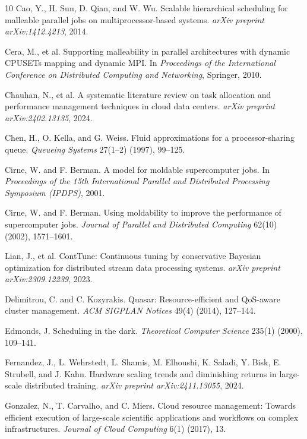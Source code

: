 \documentclass[11pt]{article}
\theoremstyle{remark}
\theoremstyle{definition}
\numberwithin{equation}{section}
\begin{document}
{\begin{thebibliography}{10}
Cao, Y., H. Sun, D. Qian, and W. Wu.
Scalable hierarchical scheduling for malleable parallel jobs on multiprocessor-based systems.
\textit{arXiv preprint arXiv:1412.4213}, 2014.

Cera, M., et al.
Supporting malleability in parallel architectures with dynamic CPUSETs mapping and dynamic MPI.
In \textit{Proceedings of the International Conference on Distributed Computing and Networking}, Springer, 2010.

Chauhan, N., et al.
A systematic literature review on task allocation and performance management techniques in cloud data centers.
\textit{arXiv preprint arXiv:2402.13135}, 2024.

Chen, H., O. Kella, and G. Weiss.
Fluid approximations for a processor-sharing queue.
\textit{Queueing Systems} 27(1--2) (1997), 99--125.

 Cirne, W. and F. Berman.
 A model for moldable supercomputer jobs.
 In \textit{Proceedings of the 15th International Parallel and Distributed Processing Symposium (IPDPS)}, 2001.

Cirne, W. and F. Berman.
Using moldability to improve the performance of supercomputer jobs.
\textit{Journal of Parallel and Distributed Computing} 62(10) (2002), 1571--1601.


Lian, J., et al.
ContTune: Continuous tuning by conservative Bayesian optimization for distributed stream data processing systems.
\textit{arXiv preprint arXiv:2309.12239}, 2023.

Delimitrou, C. and C. Kozyrakis.
Quasar: Resource-efficient and QoS-aware cluster management.
\textit{ACM SIGPLAN Notices} 49(4) (2014), 127--144.

Edmonds, J.
Scheduling in the dark.
\textit{Theoretical Computer Science} 235(1) (2000), 109--141.

Fernandez, J., L. Wehrstedt, L. Shamis, M. Elhoushi, K. Saladi, Y. Bisk, E. Strubell, and J. Kahn.
Hardware scaling trends and diminishing returns in large-scale distributed training.
\textit{arXiv preprint arXiv:2411.13055}, 2024.


Gonzalez, N., T. Carvalho, and C. Miers.
Cloud resource management: Towards efficient execution of large-scale scientific applications and workflows on complex infrastructures.
\textit{Journal of Cloud Computing} 6(1) (2017), 13.




\end{thebibliography}}
\end{document}
